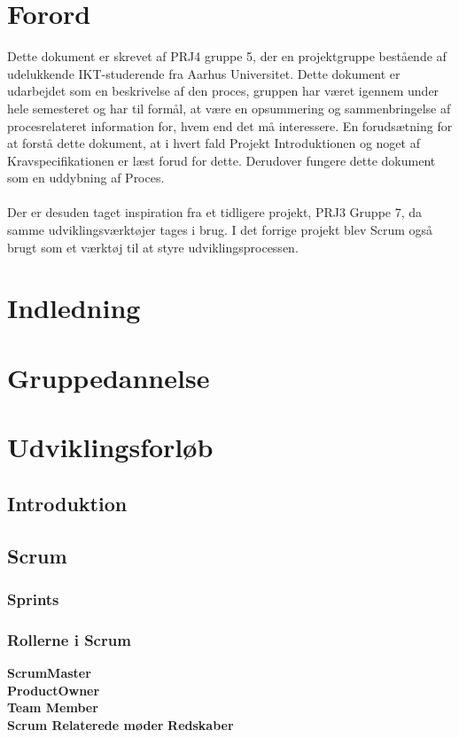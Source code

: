 \documentclass[a4paper,12pt,fleqn,oneside]{article}
\begin{document}

\newpage
\tableofcontents \newpage 

\section{Forord}
Dette dokument er skrevet af PRJ4 gruppe 5, der en projektgruppe bestående af udelukkende IKT-studerende fra Aarhus Universitet. Dette dokument er udarbejdet som en beskrivelse af den proces, gruppen har været igennem under hele semesteret og har til formål, at være en opsummering og sammenbringelse af procesrelateret information for, hvem end det må interessere. En forudsætning for at forstå dette dokument, at i hvert fald Projekt Introduktionen og noget af Kravspecifikationen er læst forud for dette. Derudover fungere dette dokument som en uddybning af Proces. \\\\
Der er desuden taget inspiration fra et tidligere projekt, PRJ3 Gruppe 7, da samme udviklingsværktøjer tages i brug. I det forrige projekt blev Scrum også brugt som et værktøj til at styre udviklingsprocessen. 

\section{Indledning}

\section{Gruppedannelse}

\section{Udviklingsforløb}
\subsection{Introduktion}
\subsection{Scrum}
\subsubsection{Sprints}

\subsubsection{Rollerne i Scrum}
\textbf{ScrumMaster} \\
\textbf{ProductOwner} \\
\textbf{Team Member} \\
\textbf{Scrum Relaterede møder} 
\textbf{Redskaber} \\ 
\end{document}
